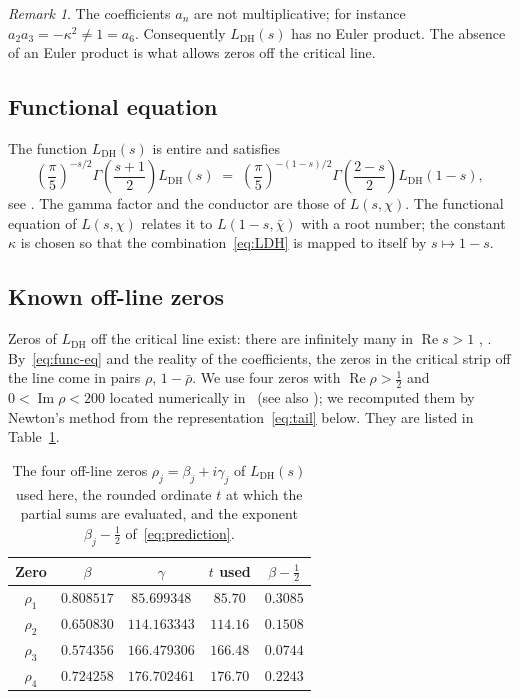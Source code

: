 \documentclass[11pt]{amsart}
\theoremstyle{definition}
\theoremstyle{remark}
\newtheorem{remark}[theorem]{Remark}
\renewcommand{\DH}{\mathrm{DH}}
\newcommand{\re}{\operatorname{Re}}
\newcommand{\im}{\operatorname{Im}}
\begin{document}
\begin{remark}\label{rem:not-multiplicative}
The coefficients $a_n$ are not multiplicative; for instance
$a_2a_3=-\kappa^2\neq1=a_6$.  Consequently $L_{\DH}(s)$ has no Euler
product.  The absence of an Euler product is what allows zeros off the
critical line.
\end{remark}

\subsection{Functional equation}

The function $L_{\DH}(s)$ is entire and satisfies
\begin{equation}\label{eq:func-eq}
  \left(\frac{\pi}{5}\right)^{-s/2}
  \Gamma\!\left(\frac{s+1}{2}\right) L_{\DH}(s)
  \;=\;
  \left(\frac{\pi}{5}\right)^{-(1-s)/2}
  \Gamma\!\left(\frac{2-s}{2}\right) L_{\DH}(1-s),
\end{equation}
see \cite[\S10.25]{Titchmarsh1986}.  The gamma factor and the conductor are
those of $L(s,\chi)$.  The functional equation of $L(s,\chi)$ relates it to
$L(1-s,\bar\chi)$ with a root number; the constant $\kappa$ is chosen so
that the combination~\eqref{eq:LDH} is mapped to itself by $s\mapsto1-s$.

\subsection{Known off-line zeros}

Zeros of $L_{\DH}$ off the critical line exist: there are infinitely many
in $\re s>1$ \cite{DavenportHeilbronn1936}, \cite[\S10.25]{Titchmarsh1986}.
By~\eqref{eq:func-eq} and the reality of the coefficients, the zeros in the
critical strip off the line come in pairs $\rho$, $1-\bar\rho$.  We use four
zeros with $\re\rho>\tfrac12$ and $0<\im\rho<200$ located numerically
in~\cite{Spira1994} (see also \cite{BalanzarioSanchezOrtiz2007}); we
recomputed them by Newton's method from the representation~\eqref{eq:tail}
below.  They are listed in Table~\ref{tab:offline-zeros}.

\begin{table}[ht]
\centering
\caption{The four off-line zeros $\rho_j=\beta_j+i\gamma_j$ of
  $L_{\DH}(s)$ used here, the rounded ordinate $t$ at which the partial
  sums are evaluated, and the exponent $\beta_j-\tfrac12$
  of~\eqref{eq:prediction}.}
\label{tab:offline-zeros}
\begin{tabular}{@{}ccccc@{}}
\toprule
Zero & $\beta$ & $\gamma$ & $t$ used &
  $\beta - \tfrac{1}{2}$ \\
\midrule
$\rho_1$ & $0.808517$ & $85.699348$  & $85.70$  & $0.3085$ \\
$\rho_2$ & $0.650830$ & $114.163343$ & $114.16$ & $0.1508$ \\
$\rho_3$ & $0.574356$ & $166.479306$ & $166.48$ & $0.0744$ \\
$\rho_4$ & $0.724258$ & $176.702461$ & $176.70$ & $0.2243$ \\
\bottomrule
\end{tabular}
\end{table}
\end{document}
